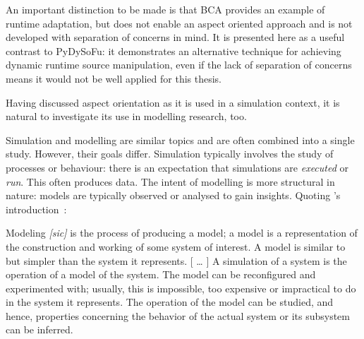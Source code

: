 An important distinction to be made is that BCA provides an example of runtime
adaptation, but does not enable an aspect oriented approach and is not developed
with separation of concerns in mind. It is presented here as a useful contrast
to PyDySoFu: it demonstrates an alternative technique for achieving dynamic
runtime source manipulation, even if the lack of separation of concerns means it
would not be well applied for this thesis.









Having discussed aspect orientation as it is used in a simulation context, it is
natural to investigate its use in modelling research, too.

Simulation and modelling are similar topics and are often combined into a single
study. However, their goals differ. Simulation typically involves the study of
processes or behaviour: there is an expectation that simulations are
\emph{executed} or \emph{run}. This often produces data. The intent of modelling
is more structural in nature: models are typically observed or analysed to gain
insights. Quoting \citeauthor{smintro}'s introduction~\cite{smintro}:

\begin{displayquote}
    Modeling \emph{[sic]} is the process of producing a model; a model
    is a representation of the construction and working of
    some system of interest. A model is similar to but
    simpler than the system it represents.
    \newline{}
    [ \ldots{} ]
    \newline{}
    A simulation of a system is the operation of a model of the system. The
    model can be reconfigured and experimented with; usually, this is
    impossible, too expensive or impractical to do in the system it represents.
    The operation of the model can be studied, and hence, properties concerning
    the behavior of the actual system or its subsystem can be inferred.
\end{displayquote}

